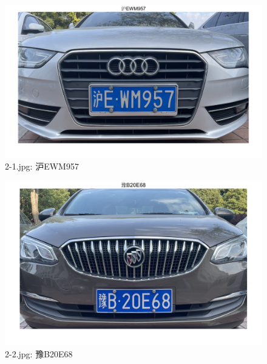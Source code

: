 \documentclass[utf8,a4paper]{ctexart}
\begin{document}
\begin{appendices}
\begin{minipage}{0.44\linewidth}
    \end{minipage}
    \par


    \begin{minipage}{0.44\linewidth}
        \begin{figure}[H]
            \center
            \includegraphics[width=\linewidth]{../result/medium/2-1.png}
            \caption{2-1.jpg: 沪EWM957}
        \end{figure}
    \end{minipage}
    \hfill
    \begin{minipage}{0.44\linewidth}
        \begin{figure}[H]
            \center
            \includegraphics[width=\linewidth]{../result/medium/2-2.png}
            \caption{2-2.jpg: 豫B20E68}
        \end{figure}
    \end{minipage}
    \par

\end{appendices}
\end{document}
